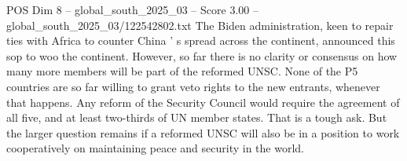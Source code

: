 \begin{textsample}{POS Dim 8 – global\_south\_2025\_03 – Score 3.00 – global\_south\_2025\_03/122542802.txt}
The Biden administration, keen to repair ties with Africa to counter China ' s spread across the continent, announced this sop to woo the continent.
However, so far there is no clarity or consensus on how many more members will be part of the reformed UNSC.
None of the P5 countries are so far willing to grant veto rights to the new entrants, whenever that happens.
Any reform of the Security Council would require the agreement of all five, and at least two-thirds of UN member states.
That is a tough ask.
But the larger question remains if a reformed UNSC will also be in a position to work cooperatively on maintaining peace and security in the world.

\end{textsample}
